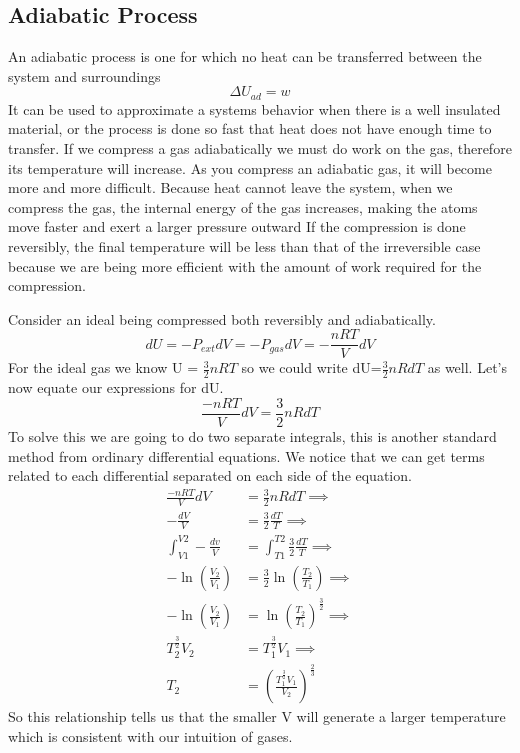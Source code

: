 \documentclass{article}
\begin{document}
\subsection*{Adiabatic Process} 
An adiabatic process is one for which no heat can be transferred between the system and surroundings 
\begin{equation}
    \Delta U_{ad} = w
\end{equation}
It can be used to approximate a systems behavior when there is a well insulated material, or the process is done so fast that heat does not have enough time to transfer. 
If we compress a gas adiabatically we must do work on the gas, therefore its temperature will increase. 
 As you compress an adiabatic gas, it will become more and more difficult.
Because heat cannot leave the system, when we compress the gas, the internal energy of the gas increases, making the atoms move faster and exert a larger pressure outward 
If the compression is done reversibly, the final temperature will be less than that of the irreversible case because we are being more efficient with the amount of work required for the compression. 

Consider an ideal being compressed both reversibly and adiabatically.
\begin{equation}
        dU = -P_{ext}dV = -P_{gas}dV = -\frac{nRT}{V}dV
\end{equation}
For the ideal gas we know U = $\frac{3}{2}nRT$ so we could write dU=$\frac{3}{2}nRdT$ as well. 
Let's now equate our expressions for dU. 
\begin{equation}
    \frac{-nRT}{V}dV = \frac{3}{2}nRdT
\end{equation}
To solve this we are going to do two separate integrals, this is another standard method from ordinary differential equations. 
We notice that we can get terms related to each differential separated on each side of the equation.
\begin{equation}
\begin{split}
     \frac{-nRT}{V}dV &= \frac{3}{2}nRdT \implies \\
      -\frac{dV}{V} &= \frac{3}{2}\frac{dT}{T} \implies \\
      \int_{V1}^{V2}-\frac{dv}{V} &= \int_{T1}^{T2} \frac{3}{2}\frac{dT}{T} \implies \\
      -\ln\left(\frac{V_2}{V_1}\right) &= \frac{3}{2}\ln\left(\frac{T_2}{T_1}\right) \implies \\
      -\ln\left(\frac{V_2}{V_1}\right) &=\ln\left(\frac{T_2}{T_1}\right)^{\frac{3}{2}} \implies \\
      T_2^{\frac{3}{2}}V_2 &= T_1^{\frac{3}{2}}V_1 \implies \\
      T_2 &= \left ( \frac{T_1^{\frac{3}{2}} V_1}{V_2} \right )^{\frac{2}{3}}
\end{split}
\end{equation}
So this relationship tells us that the smaller V will generate a larger temperature which is consistent with our intuition of gases. 
\end{document}
